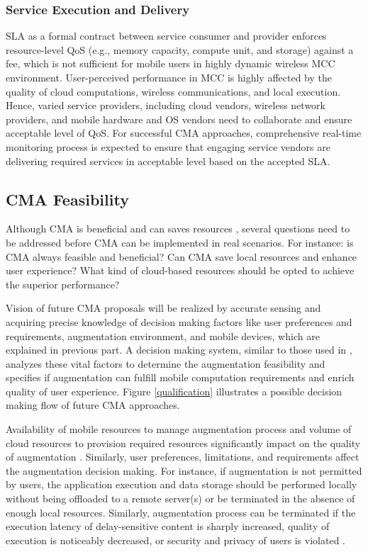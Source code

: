 \documentclass[publish]{IEEEtran}
\begin{document}
\subsubsection{Service Execution and Delivery}  
SLA as a formal contract between service consumer and provider enforces resource-level QoS (e.g., memory capacity, compute unit, and storage) against a fee, which is not sufficient for mobile users in highly dynamic wireless MCC environment. User-perceived performance in MCC is highly affected by the quality of cloud computations, wireless communications, and local execution. Hence, varied service providers, including cloud vendors, wireless network providers, and mobile hardware and OS vendors need to collaborate and ensure acceptable level of QoS. For successful CMA approaches, comprehensive real-time monitoring process is expected to ensure that engaging service vendors are delivering required services in acceptable level based on the accepted SLA.

\subsection{CMA Feasibility} \label{feasibility}
Although CMA is beneficial and can saves resources \cite{Kumar2010}, several questions need to be addressed before CMA can be implemented in real scenarios. For instance: is CMA always feasible and beneficial? Can CMA save local resources and enhance user experience? What kind of cloud-based resources should be opted to achieve the superior performance? 

Vision of future CMA proposals will be realized by accurate sensing and acquiring precise knowledge of decision making factors like user preferences and requirements, augmentation environment, and mobile devices, which are explained in previous part. A decision making system, similar to those used in \cite{cuervo2010maui,Zhang2011,Giurgiu2009}, analyzes these vital factors to determine the augmentation feasibility and specifies if augmentation can fulfill mobile computation requirements and enrich quality of user experience. Figure \ref{qualification} illustrates a possible decision making flow of future CMA approaches.

Availability of mobile resources to manage augmentation process and volume of cloud resources to provision required resources significantly impact on the quality of augmentation \cite{Balan2006}. Similarly, user preferences, limitations, and requirements affect the augmentation decision making. For instance, if augmentation is not permitted by users, the application execution and data storage should be performed locally without being offloaded to a remote server(s) or be terminated in the absence of enough local resources. Similarly, augmentation process can be terminated if the execution latency of delay-sensitive content is sharply increased, quality of execution is noticeably decreased, or security and privacy of users is violated \cite{Sharifi2011}. 
\end{document}
